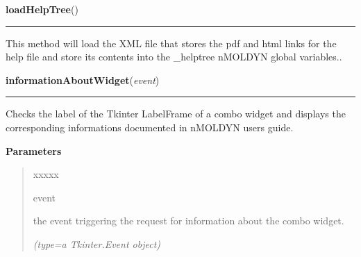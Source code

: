    \vspace{0.5ex}

\hspace{.8\funcindent}\begin{boxedminipage}{\funcwidth}

    \raggedright \textbf{loadHelpTree}()

    \vspace{-1.5ex}

    \rule{\textwidth}{0.5\fboxrule}
\setlength{\parskip}{2ex}
    This method will load the XML file that stores the pdf and html links 
    for the help file and store its contents into the \_helptree nMOLDYN 
    global variables..

\setlength{\parskip}{1ex}
    \end{boxedminipage}

    \label{nMOLDYN:GUI:Widgets:informationAboutWidget}

    \vspace{0.5ex}

\hspace{.8\funcindent}\begin{boxedminipage}{\funcwidth}

    \raggedright \textbf{informationAboutWidget}(\textit{event})

    \vspace{-1.5ex}

    \rule{\textwidth}{0.5\fboxrule}
\setlength{\parskip}{2ex}
    Checks the label of the Tkinter LabelFrame of a combo widget and 
    displays the corresponding informations documented in nMOLDYN users 
    guide.

\setlength{\parskip}{1ex}
      \textbf{Parameters}
      \vspace{-1ex}

      \begin{quote}
        \begin{Ventry}{xxxxx}

          \item[event]

          the event triggering the request for information about the combo 
          widget.

            {\it (type=a Tkinter.Event object)}

        \end{Ventry}

      \end{quote}

    \end{boxedminipage}



